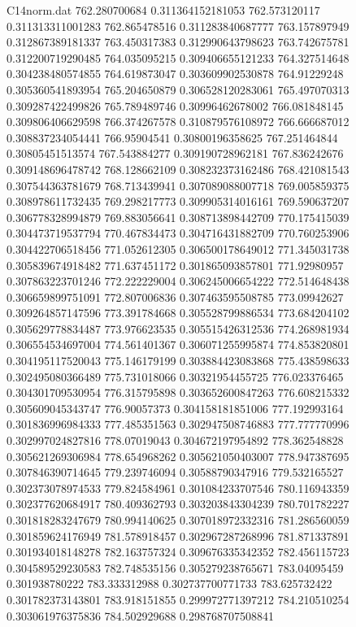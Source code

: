 \begin{filecontents}{C14norm.dat}
762.280700684			0.311364152181053
762.573120117			0.311313311001283
762.865478516			0.311283840687777
763.157897949			0.312867389181337
763.450317383			0.312990643798623
763.742675781			0.312200719290485
764.035095215			0.309406655121233
764.327514648			0.304238480574855
764.619873047			0.303609902530878
764.91229248			0.305360541893954
765.204650879			0.306528120283061
765.497070313			0.309287422499826
765.789489746			0.30996462678002
766.081848145			0.309806406629598
766.374267578			0.310879576108972
766.666687012			0.308837234054441
766.95904541			0.30800196358625
767.251464844			0.30805451513574
767.543884277			0.309190728962181
767.836242676			0.309148696478742
768.128662109			0.308232373162486
768.421081543			0.307544363781679
768.713439941			0.307089088007718
769.005859375			0.308978611732435
769.298217773			0.309905314016161
769.590637207			0.306778328994879
769.883056641			0.308713898442709
770.175415039			0.304473719537794
770.467834473			0.304716431882709
770.760253906			0.304422706518456
771.052612305			0.306500178649012
771.345031738			0.305839674918482
771.637451172			0.301865093857801
771.92980957			0.307863223701246
772.222229004			0.306245006654222
772.514648438			0.306659899751091
772.807006836			0.307463595508785
773.09942627			0.309264857147596
773.391784668			0.305528799886534
773.684204102			0.305629778834487
773.976623535			0.305515426312536
774.268981934			0.306554534697004
774.561401367			0.306071255995874
774.853820801			0.304195117520043
775.146179199			0.303884423083868
775.438598633			0.302495080366489
775.731018066			0.30321954455725
776.023376465			0.304301709530954
776.315795898			0.303652600847263
776.608215332			0.305609045343747
776.90057373			0.304158181851006
777.192993164			0.301836996984333
777.485351563			0.302947508746883
777.777770996			0.302997024827816
778.07019043			0.304672197954892
778.362548828			0.305621269306984
778.654968262			0.305621050403007
778.947387695			0.307846390714645
779.239746094			0.30588790347916
779.532165527			0.302373078974533
779.824584961			0.301084233707546
780.116943359			0.302377620684917
780.409362793			0.303203843304239
780.701782227			0.301818283247679
780.994140625			0.307018972332316
781.286560059			0.301859624176949
781.578918457			0.302967287268996
781.871337891			0.301934018148278
782.163757324			0.309676335342352
782.456115723			0.304589529230583
782.748535156			0.305279238765671
783.04095459			0.301938780222
783.333312988			0.302737700771733
783.625732422			0.301782373143801
783.918151855			0.299972771397212
784.210510254			0.303061976375836
784.502929688			0.298768707508841

\end{filecontents}
